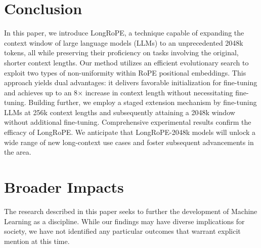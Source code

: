 \section{Conclusion}

In this paper, we introduce LongRoPE, a technique capable of expanding the context window of large language models (LLMs) to an unprecedented 2048k tokens, all while preserving their proficiency on tasks involving the original, shorter context lengths. Our method utilizes an efficient evolutionary search to exploit two types of non-uniformity within RoPE positional embeddings. This approach yields dual advantages: it delivers favorable initialization for fine-tuning and achieves up to an 8$\times$ increase in context length without necessitating fine-tuning. Building further, we employ a staged extension mechanism by fine-tuning LLMs at 256k context lengths and subsequently attaining a 2048k window without additional fine-tuning. Comprehensive experimental results confirm the efficacy of LongRoPE. We anticipate that LongRoPE-2048k models will unlock a wide range of new long-context use cases and foster subsequent advancements in the area.

\section*{Broader Impacts} The research described in this paper seeks to further the development of Machine Learning as a discipline. While our findings may have diverse implications for society, we have not identified any particular outcomes that warrant explicit mention at this time.

	\balance

